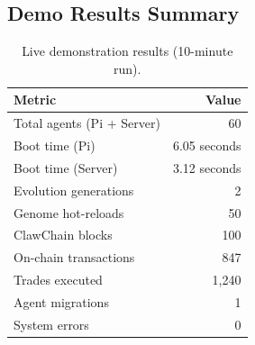 \documentclass{article}
\begin{document}
\subsection{Demo Results Summary}

\begin{table}[t]
\caption{Live demonstration results (10-minute run).}
\label{tab:demo}
\centering
\small
\begin{tabular}{lr}
\toprule
\textbf{Metric} & \textbf{Value} \\
\midrule
Total agents (Pi + Server) & 60 \\
Boot time (Pi) & 6.05 seconds \\
Boot time (Server) & 3.12 seconds \\
Evolution generations & 2 \\
Genome hot-reloads & 50 \\
ClawChain blocks & 100 \\
On-chain transactions & 847 \\
Trades executed & 1,240 \\
Agent migrations & 1 \\
System errors & 0 \\
\bottomrule
\end{tabular}
\end{table}

%
%
\end{document}
